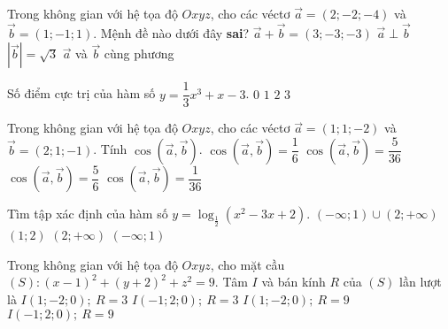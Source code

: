 \begin{ex}%
	Trong không gian với hệ tọa độ $Oxyz$, cho các véctơ $\overrightarrow{a}=(2;-2;-4)$ và $\overrightarrow{b}=(1;-1;1)$. Mệnh đề nào dưới đây {\bf sai}?
	\choice
	{$\overrightarrow{a}+\overrightarrow{b}=(3;-3;-3)$}
	{$\overrightarrow{a}\perp\overrightarrow{b}$}
	{$\left|\overrightarrow{b}\right|=\sqrt3$}
	{\True $\overrightarrow{a}$ và $\overrightarrow{b}$ cùng phương}
\end{ex}
\begin{ex}%
	Số điểm cực trị của hàm số $y=\dfrac13x^3+x-3$.
	\choice
	{\True $0$}
	{$1$}
	{$2$}
	{$3$}
\end{ex}
\begin{ex}%
	Trong không gian với hệ tọa độ $Oxyz$, cho các véctơ $\overrightarrow{a}=(1;1;-2)$ và $\overrightarrow{b}=(2;1;-1)$. Tính $\cos\left(\overrightarrow{a},\overrightarrow{b}\right)$.
	\choice
	{$\cos\left(\overrightarrow{a},\overrightarrow{b}\right)=\dfrac16$}
	{$\cos\left(\overrightarrow{a},\overrightarrow{b}\right)=\dfrac5{36}$}
	{\True $\cos\left(\overrightarrow{a},\overrightarrow{b}\right)=\dfrac56$}
	{$\cos\left(\overrightarrow{a},\overrightarrow{b}\right)=\dfrac1{36}$}
\end{ex}

\begin{ex}%
	Tìm tập xác định của hàm số $y=\log_{\frac12}\left(x^2-3x+2\right)$.
	\choice
	{\True $(-\infty;1)\cup(2;+\infty)$}
	{$(1;2)$}
	{$(2;+\infty)$}
	{$(-\infty;1)$}
	\loigiai{Điều kiện 
		$x^2-3x+2>0\Leftrightarrow \left[\begin{aligned}
		&x<1\\&x>2
		\end{aligned}\right.$ nên tập xác định của hàm số $(-\infty;1)\cup(2;+\infty)$.
	}
\end{ex}

\begin{ex}%
	Trong không gian với hệ tọa độ $Oxyz$, cho mặt cầu $(S):(x-1)^2+(y+2)^2+z^2=9$. Tâm $I$ và bán kính $R$ của $(S)$ lần lượt là
	\choice
	{\True $I(1;-2;0);~R=3$}
	{$I(-1;2;0);~R=3$}
	{$I(1;-2;0);~R=9$}
	{$I(-1;2;0);~R=9$}
\end{ex}

